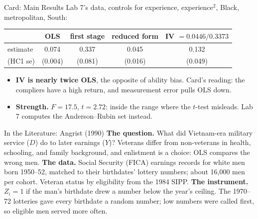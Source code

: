 \documentclass[aspectratio=169,11pt,xcolor=dvipsnames]{beamer}
\begin{document}
\begin{frame}{Card: Main Results}
Lab 7's data, controls for experience, experience$^2$, Black, metropolitan,
South:
\begin{center}\small
\renewcommand{\arraystretch}{1.1}
\begin{tabular}{@{}lcccc@{}}
\toprule
 & OLS & first stage & reduced form & IV $= 0.0446/0.3373$ \\
\midrule
estimate & 0.074 & 0.337 & 0.045 & 0.132 \\
(HC1 se) & (0.004) & (0.081) & (0.016) & (0.049) \\
\bottomrule
\end{tabular}
\end{center}
\vskip2pt
\begin{itemize}\itemsep2pt
  \item \textbf{IV is nearly twice OLS}, the opposite of ability bias. Card's
        reading: the compliers have a high return, and measurement error
        pulls OLS down.
  \item \textbf{Strength.} $F = 17.5$, $t = 2.72$: inside the range where
        the $t$-test misleads. Lab 7 computes the Anderson--Rubin set instead.
\end{itemize}
\end{frame}

\begin{frame}{In the Literature: Angrist (1990)}
\textbf{The question.} What did Vietnam-era military service ($D$) do to
later earnings ($Y$)? Veterans differ from non-veterans in health, schooling,
and family background, and enlistment is a choice: OLS compares the wrong men.
\vskip3pt
\textbf{The data.} Social Security (FICA) earnings records for white men born
1950--52, matched to their birthdates' lottery numbers; about 16,000 men per
cohort. Veteran status by eligibility from the 1984 SIPP.
\vskip3pt
\textbf{The instrument.} $Z_i = 1$ if the man's birthdate drew a number below
the year's ceiling. The 1970--72 lotteries gave every birthdate a random
number; low numbers were called first, so eligible men served more often.
\end{frame}
\end{document}
